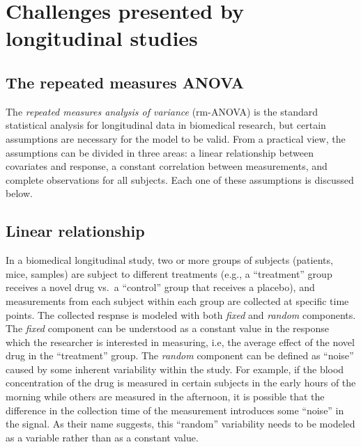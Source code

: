 \documentclass[
]{article}
\begin{document}
\hypertarget{challenges-presented-by-longitudinal-studies}{%
\section{Challenges presented by longitudinal studies}\label{challenges-presented-by-longitudinal-studies}}

\hypertarget{the-repeated-measures-anova}{%
\subsection{The repeated measures ANOVA}\label{the-repeated-measures-anova}}

The \emph{repeated measures analysis of variance} (rm-ANOVA) is the standard statistical analysis for longitudinal data in biomedical research, but certain assumptions are necessary for the model to be valid. From a practical view, the assumptions can be divided in three areas: a linear relationship between covariates and response, a constant correlation between measurements, and complete observations for all subjects. Each one of these assumptions is discussed below.

\hypertarget{linear-relationship}{%
\subsection{Linear relationship}\label{linear-relationship}}

In a biomedical longitudinal study, two or more groups of subjects (patients, mice, samples) are subject to different treatments (e.g., a ``treatment'' group receives a novel drug vs.~a ``control'' group that receives a placebo), and measurements from each subject within each group are collected at specific time points. The collected respnse is modeled with both \emph{fixed} and \emph{random} components. The \emph{fixed} component can be understood as a constant value in the response which the researcher is interested in measuring, i.e, the average effect of the novel drug in the ``treatment'' group. The \emph{random} component can be defined as ``noise'' caused by some inherent variability within the study. For example, if the blood concentration of the drug is measured in certain subjects in the early hours of the morning while others are measured in the afternoon, it is possible that the difference in the collection time of the measurement introduces some ``noise'' in the signal. As their name suggests, this ``random'' variability needs to be modeled as a variable rather than as a constant value.
\end{document}
